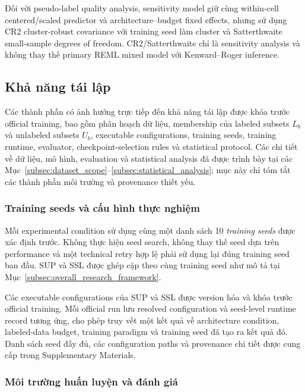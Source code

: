 \documentclass[pdflatex,sn-mathphys-num]{sn-jnl}%
\theoremstyle{thmstyleone}%
\theoremstyle{thmstyletwo}%
\theoremstyle{thmstylethree}%
\begin{document}
Đối với pseudo-label quality analysis, sensitivity model giữ cùng
within-cell centered/scaled predictor và architecture--budget fixed effects,
nhưng sử dụng CR2 cluster-robust covariance với training seed làm cluster
và Satterthwaite small-sample degrees of freedom. CR2/Satterthwaite chỉ là
sensitivity analysis và không thay thế primary REML mixed model với
Kenward--Roger inference.


\subsection{Khả năng tái lập}
\label{subsec:reproducibility}

Các thành phần có ảnh hưởng trực tiếp đến khả năng tái lập được khóa trước
official training, bao gồm phân hoạch dữ liệu, membership của labeled subsets \(L_b\) và unlabeled subsets \(U_b\),
executable configurations, training seeds, training runtime, evaluator,
checkpoint-selection rules và statistical protocol. Các chi tiết về dữ liệu,
mô hình, evaluation và statistical analysis đã được trình bày tại các
Mục~\ref{subsec:dataset_scope}--\ref{subsec:statistical_analysis}; mục này
chỉ tóm tắt các thành phần môi trường và provenance thiết yếu.

\subsubsection{Training seeds và cấu hình thực nghiệm}
\label{subsubsec:reproducibility_seeds}

Mỗi experimental condition sử dụng cùng một danh sách 10
\textit{training seeds} được xác định trước. Không thực hiện seed search,
không thay thế seed dựa trên performance và một technical retry hợp lệ phải
sử dụng lại đúng training seed ban đầu. SUP và SSL được ghép cặp theo cùng
training seed như mô tả tại Mục~\ref{subsec:overall_research_framework}.

Các executable configurations của SUP và SSL được version hóa và khóa
trước official training. Mỗi official run lưu resolved configuration và
seed-level runtime record tương ứng, cho phép truy vết một kết quả về
architecture condition, labeled-data budget, training paradigm và training
seed đã tạo ra kết quả đó. Danh sách seed đầy đủ, các configuration paths
và provenance chi tiết được cung cấp trong Supplementary Materials.

\subsubsection{Môi trường huấn luyện và đánh giá}
\label{subsubsec:training_runtime}
\end{document}
